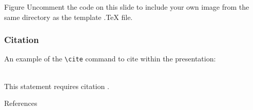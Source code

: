 \documentclass[aspectratio=169,xcolor=dvipsnames]{beamer}
\begin{document}

\begin{frame}{Figure}
    Uncomment the code on this slide to include your own image from the same directory as the template .TeX file.
\end{frame}


\begin{frame}[fragile] %
    \frametitle{Citation}
    An example of the \verb|\cite| command to cite within the presentation:\\~

    This statement requires citation \cite{p1}.
\end{frame}


\begin{frame}{References}
    \footnotesize
    
    
\end{frame}

\end{document}
